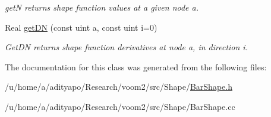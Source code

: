 \begin{DoxyCompactItemize}
\begin{DoxyCompactList}\small\item\em getN returns shape function values at a given node a. \item\end{DoxyCompactList}\item 
\hypertarget{classvoom_1_1_bar_shape_aa87f4b72df72d26ea0cb848543de1d53}{
Real \hyperlink{classvoom_1_1_bar_shape_aa87f4b72df72d26ea0cb848543de1d53}{getDN} (const uint a, const uint i=0)}
\label{classvoom_1_1_bar_shape_aa87f4b72df72d26ea0cb848543de1d53}

\begin{DoxyCompactList}\small\item\em GetDN returns shape function derivatives at node a, in direction i. \item\end{DoxyCompactList}\end{DoxyCompactItemize}


The documentation for this class was generated from the following files:\begin{DoxyCompactItemize}
\item 
/u/home/a/adityapo/Research/voom2/src/Shape/\hyperlink{_bar_shape_8h}{BarShape.h}\item 
/u/home/a/adityapo/Research/voom2/src/Shape/BarShape.cc\end{DoxyCompactItemize}
